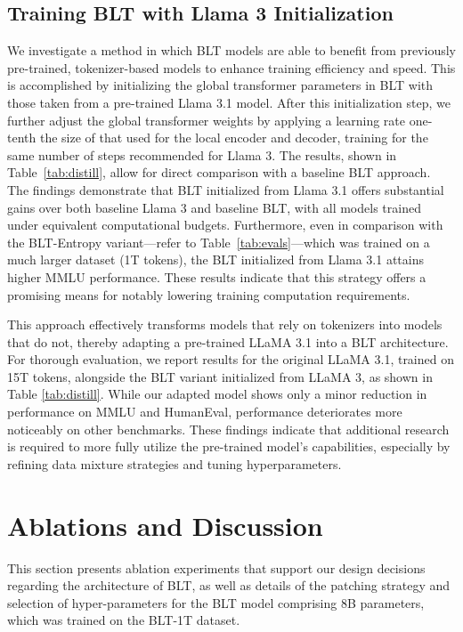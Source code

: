\subsection{Training {\textsc BLT} with Llama 3 Initialization}
\label{sec:distillation}
We investigate a method in which {\textsc BLT} models are able to benefit from previously pre-trained, tokenizer-based models to enhance training efficiency and speed. This is accomplished by initializing the global transformer parameters in {\textsc BLT} with those taken from a pre-trained Llama 3.1 model. After this initialization step, we further adjust the global transformer weights by applying a learning rate one-tenth the size of that used for the local encoder and decoder, training for the same number of steps recommended for Llama 3. The results, shown in Table~\ref{tab:distill}, allow for direct comparison with a baseline {\textsc BLT} approach. The findings demonstrate that {\textsc BLT} initialized from Llama 3.1 offers substantial gains over both baseline Llama 3 and baseline {\textsc BLT}, with all models trained under equivalent computational budgets. Furthermore, even in comparison with the {\textsc BLT}-Entropy variant—refer to Table~\ref{tab:evals}—which was trained on a much larger dataset (1T tokens), the {\textsc BLT} initialized from Llama 3.1 attains higher MMLU performance. These results indicate that this strategy offers a promising means for notably lowering training computation requirements.

This approach effectively transforms models that rely on tokenizers into models that do not, thereby adapting a pre-trained LLaMA 3.1 into a {\textsc BLT} architecture. For thorough evaluation, we report results for the original LLaMA 3.1, trained on 15T tokens, alongside the {\textsc BLT} variant initialized from LLaMA 3, as shown in Table \ref{tab:distill}. While our adapted model shows only a minor reduction in performance on MMLU and HumanEval, performance deteriorates more noticeably on other benchmarks. These findings indicate that additional research is required to more fully utilize the pre-trained model’s capabilities, especially by refining data mixture strategies and tuning hyperparameters.

\section{Ablations and Discussion}
\label{section:ablations}
This section presents ablation experiments that support our design decisions regarding the architecture of {\textsc BLT}, as well as details of the patching strategy and selection of hyper-parameters for the {\textsc BLT} model comprising 8B parameters, which was trained on the {\textsc BLT}-1T dataset.

